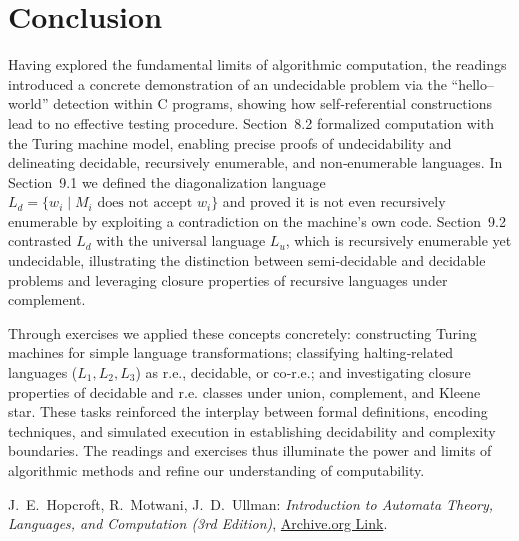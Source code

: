 \documentclass{article}
\begin{document}
\section{Conclusion}
Having explored the fundamental limits of algorithmic computation, the readings introduced a concrete demonstration of an undecidable problem via the “hello–world” detection within C programs, showing how self‑referential constructions lead to no effective testing procedure. Section 8.2 formalized computation with the Turing machine model, enabling precise proofs of undecidability and delineating decidable, recursively enumerable, and non‑enumerable languages. In Section 9.1 we defined the diagonalization language \(L_{d}=\{w_i\mid M_i\text{ does not accept }w_i\}\) and proved it is not even recursively enumerable by exploiting a contradiction on the machine’s own code. Section 9.2 contrasted \(L_{d}\) with the universal language \(L_{u}\), which is recursively enumerable yet undecidable, illustrating the distinction between semi‑decidable and decidable problems and leveraging closure properties of recursive languages under complement.

Through exercises we applied these concepts concretely: constructing Turing machines for simple language transformations; classifying halting‑related languages (\(L_{1},L_{2},L_{3}\)) as r.e., decidable, or co‑r.e.; and investigating closure properties of decidable and r.e. classes under union, complement, and Kleene star. These tasks reinforced the interplay between formal definitions, encoding techniques, and simulated execution in establishing decidability and complexity boundaries. The readings and exercises thus illuminate the power and limits of algorithmic methods and refine our understanding of computability.


\begin{thebibliography}{99}
     J.~E.~Hopcroft, R.~Motwani, J.~D.~Ullman:
    \emph{Introduction to Automata Theory, Languages, and Computation (3rd Edition)}, 
    \href{https://archive.org/details/hopcroft-motwani-ullman-introduction-to-automata-theory-languages-and-computations-3rd-edition/page/65/mode/1up?view=theater}{Archive.org Link}.
\end{thebibliography}
\end{document}
